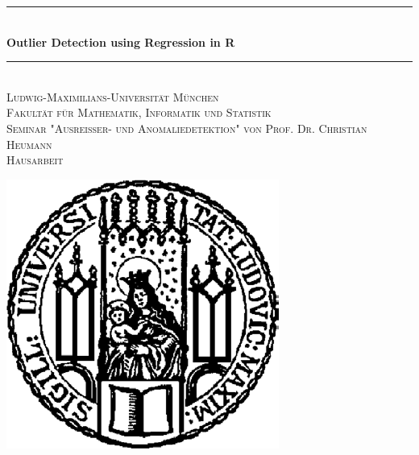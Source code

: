 \documentclass[]{report}
\title{}
\author{Samuel Lippl}
\date{2018-09-30}
\theoremstyle{definition}
\theoremstyle{definition}
\theoremstyle{definition}
\theoremstyle{remark}
\begin{document}
\begin{titlepage}


\newcommand{\HRule}{\rule{\linewidth}{0.5mm}} %

\center %


\HRule \\[0.4cm]
{ \huge \bfseries Outlier Detection using Regression in R}\\[0.4cm] %
\HRule \\[1.5cm]


\textsc{\LARGE Ludwig-Maximilians-Universität München}\\[0.5cm] %
\textsc{\Large Fakultät für Mathematik, Informatik und Statistik}\\[1.5cm]


\textsc{\Large Seminar "Ausreißer- und Anomaliedetektion" von Prof. Dr. Christian Heumann}\\[0.5cm] %
\textsc{\large Hausarbeit}\\[0.5cm] %


\vfill

\includegraphics[height=0.2\textheight]{figs/sigill.png}\\[1cm] %




\end{titlepage}
\end{document}
